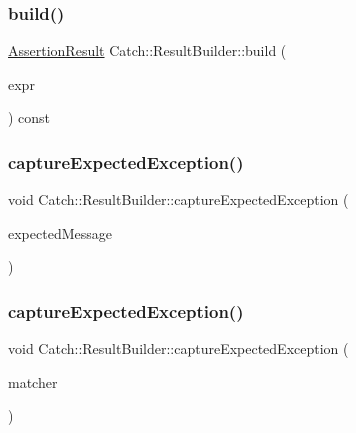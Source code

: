 \mbox{\label{class_catch_1_1_result_builder_a475d19a04c5d10a5a87cbb85447b59da}} 
\subsubsection{\texorpdfstring{build()}{build()}\hspace{0.1cm}{\footnotesize\ttfamily [2/2]}}
{\footnotesize\ttfamily \hyperlink{class_catch_1_1_assertion_result}{Assertion\+Result} Catch\+::\+Result\+Builder\+::build (\begin{DoxyParamCaption}\item[{\hyperlink{struct_catch_1_1_decomposed_expression}{Decomposed\+Expression} const \&}]{expr }\end{DoxyParamCaption}) const}

\mbox{\label{class_catch_1_1_result_builder_a9ac96f6220c8dd8e4feee725c6228d77}} 
\subsubsection{\texorpdfstring{capture\+Expected\+Exception()}{captureExpectedException()}\hspace{0.1cm}{\footnotesize\ttfamily [1/2]}}
{\footnotesize\ttfamily void Catch\+::\+Result\+Builder\+::capture\+Expected\+Exception (\begin{DoxyParamCaption}\item[{\textbf{ std\+::string} const \&}]{expected\+Message }\end{DoxyParamCaption})}

\mbox{\label{class_catch_1_1_result_builder_a2d6a194258f07f212fef098c0201038a}} 
\subsubsection{\texorpdfstring{capture\+Expected\+Exception()}{captureExpectedException()}\hspace{0.1cm}{\footnotesize\ttfamily [2/2]}}
{\footnotesize\ttfamily void Catch\+::\+Result\+Builder\+::capture\+Expected\+Exception (\begin{DoxyParamCaption}\item[{\hyperlink{struct_catch_1_1_matchers_1_1_impl_1_1_matcher_base}{Matchers\+::\+Impl\+::\+Matcher\+Base}$<$ \textbf{ std\+::string} $>$ const \&}]{matcher }\end{DoxyParamCaption})}

